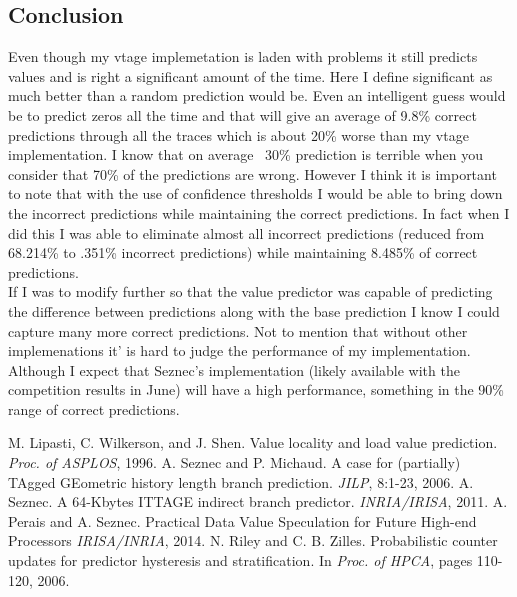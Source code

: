 \documentclass[12pt]{article}
\newcommand\tab[1][1cm]{\hspace*{#1}}
\begin{document}
\begin{multicols}{2}
\section{Conclusion}
\tab Even though my vtage implemetation is laden with problems it still predicts values and is right a significant amount of the time. Here I define significant as much better than a random prediction would be. Even an intelligent guess would be to predict zeros all the time and that will give an average of 9.8\% correct predictions through all the traces which is about 20\% worse than my vtage implementation. I know that on average ~30\% prediction is terrible when you consider that 70\% of the predictions are wrong. However I think it is important to note that with the use of confidence thresholds I would be able to bring down the incorrect predictions while maintaining the correct predictions. In fact when I did this I was able to eliminate almost all incorrect predictions (reduced from 68.214\% to .351\% incorrect predictions) while maintaining 8.485\% of correct predictions.\\
\tab If I was to modify further so that the value predictor was capable of predicting the difference between predictions along with the base prediction I know I could capture many more correct predictions. Not to mention that without other implemenations it' is hard to judge the performance of my implementation. Although I expect that Seznec's implementation (likely available with the competition results in June) will have a high performance, something in the 90\% range of correct predictions.
\begin{thebibliography}{9}
M. Lipasti, C. Wilkerson, and J. Shen. Value locality and load value prediction.
\textit{Proc. of ASPLOS}, 1996.
A. Seznec and P. Michaud. A case for (partially) TAgged GEometric history length branch prediction.
\textit{JILP}, 8:1-23, 2006.
A. Seznec. A 64-Kbytes ITTAGE indirect branch predictor.
\textit{INRIA/IRISA}, 2011.
A. Perais and A. Seznec. Practical Data Value Speculation for Future High-end Processors
\textit{IRISA/INRIA}, 2014.
N. Riley and C. B. Zilles. Probabilistic counter updates for predictor hysteresis and stratification. In 
\textit{Proc. of HPCA}, pages 110-120, 2006.
\end{thebibliography}
\end{multicols}
\end{document}
